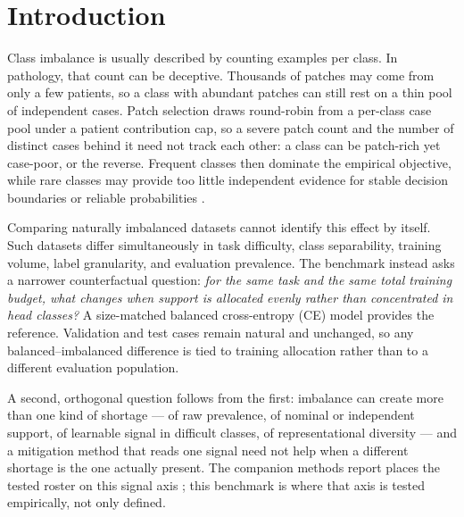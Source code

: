 \documentclass[11pt]{article}
\begin{document}
\setcounter{tocdepth}{2}
\tableofcontents
\clearpage

\section{Introduction}
Class imbalance is usually described by counting examples per class. In pathology, that count can be deceptive. Thousands of patches may come from only a few patients, so a class with abundant patches can still rest on a thin pool of independent cases. Patch selection draws round-robin from a per-class case pool under a patient contribution cap, so a severe patch count and the number of distinct cases behind it need not track each other: a class can be patch-rich yet case-poor, or the reverse. Frequent classes then dominate the empirical objective, while rare classes may provide too little independent evidence for stable decision boundaries or reliable probabilities \citep{saini2023tacklingClass,zhang2023deepLong,mosquera2024classImbalance}.

Comparing naturally imbalanced datasets cannot identify this effect by itself. Such datasets differ simultaneously in task difficulty, class separability, training volume, label granularity, and evaluation prevalence. The benchmark instead asks a narrower counterfactual question: \emph{for the same task and the same total training budget, what changes when support is allocated evenly rather than concentrated in head classes?} A size-matched balanced cross-entropy (CE) model provides the reference. Validation and test cases remain natural and unchanged, so any balanced--imbalanced difference is tied to training allocation rather than to a different evaluation population.

A second, orthogonal question follows from the first: imbalance can create more than one kind of shortage --- of raw prevalence, of nominal or independent support, of learnable signal in difficult classes, of representational diversity --- and a mitigation method that reads one signal need not help when a different shortage is the one actually present. The companion methods report places the tested roster on this signal axis \citep{queisler2026imbalanceMethods}; this benchmark is where that axis is tested empirically, not only defined.
\end{document}
